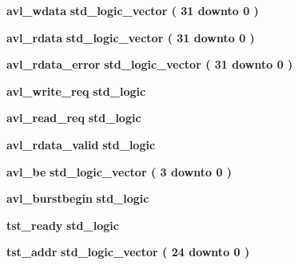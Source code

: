 \begin{DoxyCompactItemize}
\item 
{\bf avl\+\_\+wdata} {\bfseries \textcolor{comment}{std\+\_\+logic\+\_\+vector}\textcolor{vhdlchar}{ }\textcolor{vhdlchar}{(}\textcolor{vhdlchar}{ }\textcolor{vhdlchar}{ } \textcolor{vhdldigit}{31} \textcolor{vhdlchar}{ }\textcolor{keywordflow}{downto}\textcolor{vhdlchar}{ }\textcolor{vhdlchar}{ } \textcolor{vhdldigit}{0} \textcolor{vhdlchar}{ }\textcolor{vhdlchar}{)}\textcolor{vhdlchar}{ }} 
\item 
{\bf avl\+\_\+rdata} {\bfseries \textcolor{comment}{std\+\_\+logic\+\_\+vector}\textcolor{vhdlchar}{ }\textcolor{vhdlchar}{(}\textcolor{vhdlchar}{ }\textcolor{vhdlchar}{ } \textcolor{vhdldigit}{31} \textcolor{vhdlchar}{ }\textcolor{keywordflow}{downto}\textcolor{vhdlchar}{ }\textcolor{vhdlchar}{ } \textcolor{vhdldigit}{0} \textcolor{vhdlchar}{ }\textcolor{vhdlchar}{)}\textcolor{vhdlchar}{ }} 
\item 
{\bf avl\+\_\+rdata\+\_\+error} {\bfseries \textcolor{comment}{std\+\_\+logic\+\_\+vector}\textcolor{vhdlchar}{ }\textcolor{vhdlchar}{(}\textcolor{vhdlchar}{ }\textcolor{vhdlchar}{ } \textcolor{vhdldigit}{31} \textcolor{vhdlchar}{ }\textcolor{keywordflow}{downto}\textcolor{vhdlchar}{ }\textcolor{vhdlchar}{ } \textcolor{vhdldigit}{0} \textcolor{vhdlchar}{ }\textcolor{vhdlchar}{)}\textcolor{vhdlchar}{ }} 
\item 
{\bf avl\+\_\+write\+\_\+req} {\bfseries \textcolor{comment}{std\+\_\+logic}\textcolor{vhdlchar}{ }} 
\item 
{\bf avl\+\_\+read\+\_\+req} {\bfseries \textcolor{comment}{std\+\_\+logic}\textcolor{vhdlchar}{ }} 
\item 
{\bf avl\+\_\+rdata\+\_\+valid} {\bfseries \textcolor{comment}{std\+\_\+logic}\textcolor{vhdlchar}{ }} 
\item 
{\bf avl\+\_\+be} {\bfseries \textcolor{comment}{std\+\_\+logic\+\_\+vector}\textcolor{vhdlchar}{ }\textcolor{vhdlchar}{(}\textcolor{vhdlchar}{ }\textcolor{vhdlchar}{ } \textcolor{vhdldigit}{3} \textcolor{vhdlchar}{ }\textcolor{keywordflow}{downto}\textcolor{vhdlchar}{ }\textcolor{vhdlchar}{ } \textcolor{vhdldigit}{0} \textcolor{vhdlchar}{ }\textcolor{vhdlchar}{)}\textcolor{vhdlchar}{ }} 
\item 
{\bf avl\+\_\+burstbegin} {\bfseries \textcolor{comment}{std\+\_\+logic}\textcolor{vhdlchar}{ }} 
\item 
{\bf tst\+\_\+ready} {\bfseries \textcolor{comment}{std\+\_\+logic}\textcolor{vhdlchar}{ }} 
\item 
{\bf tst\+\_\+addr} {\bfseries \textcolor{comment}{std\+\_\+logic\+\_\+vector}\textcolor{vhdlchar}{ }\textcolor{vhdlchar}{(}\textcolor{vhdlchar}{ }\textcolor{vhdlchar}{ } \textcolor{vhdldigit}{24} \textcolor{vhdlchar}{ }\textcolor{keywordflow}{downto}\textcolor{vhdlchar}{ }\textcolor{vhdlchar}{ } \textcolor{vhdldigit}{0} \textcolor{vhdlchar}{ }\textcolor{vhdlchar}{)}\textcolor{vhdlchar}{ }} 

\end{DoxyCompactItemize}
